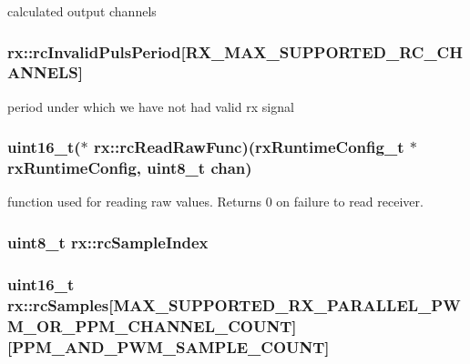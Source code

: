 calculated output channels 

\hypertarget{structrx_a3456b8cddec1d82641efe4477915fdbc}{
\subsubsection[{rc\+Invalid\+Puls\+Period}]{ rx\+::rc\+Invalid\+Puls\+Period\mbox{[}{\bf R\+X\+\_\+\+M\+A\+X\+\_\+\+S\+U\+P\+P\+O\+R\+T\+E\+D\+\_\+\+R\+C\+\_\+\+C\+H\+A\+N\+N\+E\+L\+S}\mbox{]}}}\label{structrx_a3456b8cddec1d82641efe4477915fdbc}


period under which we have not had valid rx signal 

\hypertarget{structrx_a6ce5eaf1289445a15528fb14da5494be}{
\subsubsection[{rc\+Read\+Raw\+Func}]{\setlength{\rightskip}{0pt plus 5cm}uint16\+\_\+t($\ast$ rx\+::rc\+Read\+Raw\+Func)({\bf rx\+Runtime\+Config\+\_\+t} $\ast${\bf rx\+Runtime\+Config}, uint8\+\_\+t chan)}}\label{structrx_a6ce5eaf1289445a15528fb14da5494be}


function used for reading raw values. Returns 0 on failure to read receiver. 

\hypertarget{structrx_a6cd5094300fc7085b177a8c534ea8051}{
\subsubsection[{rc\+Sample\+Index}]{\setlength{\rightskip}{0pt plus 5cm}uint8\+\_\+t rx\+::rc\+Sample\+Index}}\label{structrx_a6cd5094300fc7085b177a8c534ea8051}
\hypertarget{structrx_adcab2f3363a4181c1e0644f71fc02d63}{
\subsubsection[{rc\+Samples}]{\setlength{\rightskip}{0pt plus 5cm}uint16\+\_\+t rx\+::rc\+Samples\mbox{[}{\bf M\+A\+X\+\_\+\+S\+U\+P\+P\+O\+R\+T\+E\+D\+\_\+\+R\+X\+\_\+\+P\+A\+R\+A\+L\+L\+E\+L\+\_\+\+P\+W\+M\+\_\+\+O\+R\+\_\+\+P\+P\+M\+\_\+\+C\+H\+A\+N\+N\+E\+L\+\_\+\+C\+O\+U\+N\+T}\mbox{]}\mbox{[}{\bf P\+P\+M\+\_\+\+A\+N\+D\+\_\+\+P\+W\+M\+\_\+\+S\+A\+M\+P\+L\+E\+\_\+\+C\+O\+U\+N\+T}\mbox{]}}}\label{structrx_adcab2f3363a4181c1e0644f71fc02d63}


